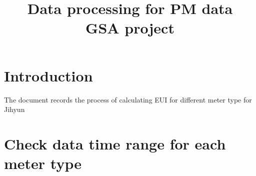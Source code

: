 \documentclass[12pt]{article}
\begin{document}
\title{Data processing for PM data\\
       \large GSA project}
\maketitle
\tableofcontents
\newpage
\section{Introduction}\label{sec:intro}
The document records the process of calculating EUI for different
meter type for Jihyun

\section{Check data time range for each meter type}
\end{document}
